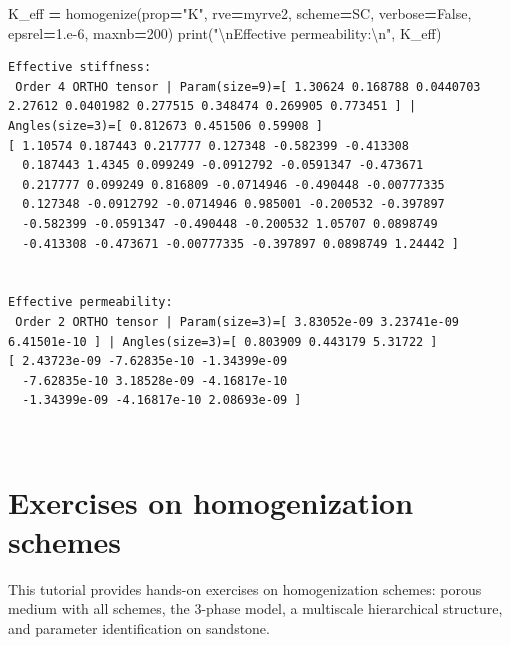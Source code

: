 \documentclass[
  a4paper,
  numbers=noendperiod,
  DIV=12]{scrreprt}
\newenvironment{Shaded}{\begin{snugshade}}{\end{snugshade}}
\newcommand{\BuiltInTok}[1]{#1}
\newcommand{\CharTok}[1]{\textcolor[rgb]{0.31,0.60,0.02}{#1}}
\newcommand{\DecValTok}[1]{\textcolor[rgb]{0.00,0.00,0.81}{#1}}
\newcommand{\FloatTok}[1]{\textcolor[rgb]{0.00,0.00,0.81}{#1}}
\newcommand{\NormalTok}[1]{#1}
\newcommand{\OperatorTok}[1]{\textcolor[rgb]{0.81,0.36,0.00}{\textbf{#1}}}
\newcommand{\StringTok}[1]{\textcolor[rgb]{0.31,0.60,0.02}{#1}}
\newcommand{\VariableTok}[1]{\textcolor[rgb]{0.00,0.00,0.00}{#1}}
\begin{document}
\begin{Shaded}
\begin{Highlighting}[]
\NormalTok{K\_eff }\OperatorTok{=}\NormalTok{ homogenize(prop}\OperatorTok{=}\StringTok{"K"}\NormalTok{, rve}\OperatorTok{=}\NormalTok{myrve2, scheme}\OperatorTok{=}\NormalTok{SC,}
\NormalTok{                   verbose}\OperatorTok{=}\VariableTok{False}\NormalTok{, epsrel}\OperatorTok{=}\FloatTok{1.e{-}6}\NormalTok{, maxnb}\OperatorTok{=}\DecValTok{200}\NormalTok{)}
\BuiltInTok{print}\NormalTok{(}\StringTok{"}\CharTok{\textbackslash{}n}\StringTok{Effective permeability:}\CharTok{\textbackslash{}n}\StringTok{"}\NormalTok{, K\_eff)}
\end{Highlighting}
\end{Shaded}

\begin{verbatim}
Effective stiffness:
 Order 4 ORTHO tensor | Param(size=9)=[ 1.30624 0.168788 0.0440703 2.27612 0.0401982 0.277515 0.348474 0.269905 0.773451 ] | Angles(size=3)=[ 0.812673 0.451506 0.59908 ]
[ 1.10574 0.187443 0.217777 0.127348 -0.582399 -0.413308 
  0.187443 1.4345 0.099249 -0.0912792 -0.0591347 -0.473671 
  0.217777 0.099249 0.816809 -0.0714946 -0.490448 -0.00777335 
  0.127348 -0.0912792 -0.0714946 0.985001 -0.200532 -0.397897 
  -0.582399 -0.0591347 -0.490448 -0.200532 1.05707 0.0898749 
  -0.413308 -0.473671 -0.00777335 -0.397897 0.0898749 1.24442 ]


Effective permeability:
 Order 2 ORTHO tensor | Param(size=3)=[ 3.83052e-09 3.23741e-09 6.41501e-10 ] | Angles(size=3)=[ 0.803909 0.443179 5.31722 ]
[ 2.43723e-09 -7.62835e-10 -1.34399e-09 
  -7.62835e-10 3.18528e-09 -4.16817e-10 
  -1.34399e-09 -4.16817e-10 2.08693e-09 ]
\end{verbatim}

\(\,\)

\chapter{Exercises on homogenization
schemes}\label{sec-exercises-schemes}

\begin{tcolorbox}[enhanced jigsaw, arc=.35mm, bottomrule=.15mm, bottomtitle=1mm, breakable, colback=white, colbacktitle=quarto-callout-important-color!10!white, colframe=quarto-callout-important-color-frame, coltitle=black, left=2mm, leftrule=.75mm, opacityback=0, opacitybacktitle=0.6, rightrule=.15mm, title={Objectives}, titlerule=0mm, toprule=.15mm, toptitle=1mm]

This tutorial provides hands-on exercises on homogenization schemes:
porous medium with all schemes, the 3-phase model, a multiscale
hierarchical structure, and parameter identification on sandstone.

\end{tcolorbox}
\end{document}
